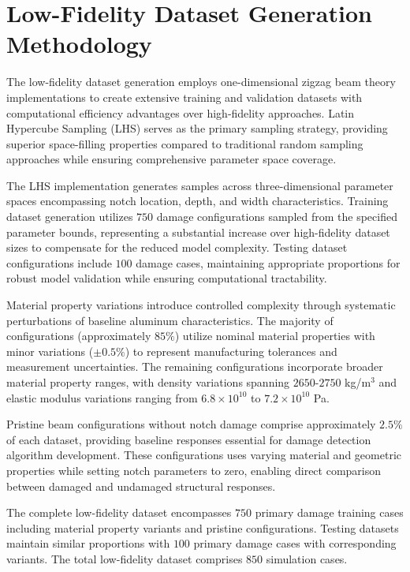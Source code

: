 \documentclass[12pt,a4paper]{report}
\begin{document}
\section{Low-Fidelity Dataset Generation Methodology}

The low-fidelity dataset generation employs one-dimensional zigzag beam theory implementations to create extensive training and validation datasets with computational efficiency advantages over high-fidelity approaches. Latin Hypercube Sampling (LHS) serves as the primary sampling strategy, providing superior space-filling properties compared to traditional random sampling approaches while ensuring comprehensive parameter space coverage.

The LHS implementation generates samples across three-dimensional parameter spaces encompassing notch location, depth, and width characteristics. Training dataset generation utilizes $750$  damage configurations sampled from the specified parameter bounds, representing a substantial increase over high-fidelity dataset sizes to compensate for the reduced model complexity. Testing dataset configurations include $100$ damage cases, maintaining appropriate proportions for robust model validation while ensuring computational tractability.

Material property variations introduce controlled complexity through systematic perturbations of baseline aluminum characteristics. The majority of configurations (approximately $85\%$) utilize nominal material properties with minor variations ($\pm 0.5\%$) to represent manufacturing tolerances and measurement uncertainties. The remaining configurations incorporate broader material property ranges, with density variations spanning $2650$-$2750$ kg/m$^3$ and elastic modulus variations ranging from $6.8 \times 10^{10}$ to $7.2 \times 10^{10}$ Pa.

Pristine beam configurations without notch damage comprise approximately $2.5\%$ of each dataset, providing baseline responses essential for damage detection algorithm development. These configurations uses varying material and geometric properties while setting notch parameters to zero, enabling direct comparison between damaged and undamaged structural responses.



The complete low-fidelity dataset encompasses $750$ primary damage training cases including material property variants and pristine configurations. Testing datasets maintain similar proportions with $100$ primary damage cases with corresponding variants. The total low-fidelity dataset comprises  $850$ simulation cases.
\end{document}
